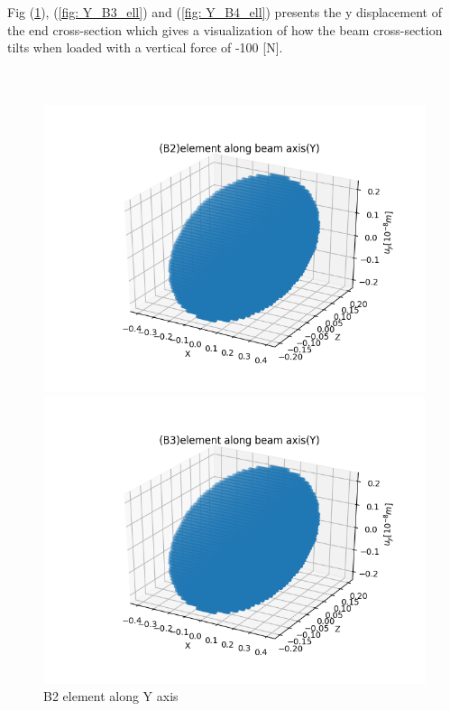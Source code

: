 \documentclass[a4paper,12pt]{article}
\begin{document}
Fig (\ref{fig: Y_B2_ell}), (\ref{fig: Y_B3_ell}) and (\ref{fig: Y_B4_ell}) presents the y displacement of the end cross-section which gives a visualization of how the beam cross-section tilts when loaded with a vertical force of -100 [N].
\\
\\ 
\\
\begin{figure}[!htbp]
  \centering
  \begin{minipage}[b]{0.49\textwidth}
    \includegraphics[width=\textwidth]{19.png}
    \caption{B2 element along Y axis}
    \label{fig: Y_B2_ell}
  \end{minipage}
  \hfill
  \begin{minipage}[b]{0.49\textwidth}
    \includegraphics[width=\textwidth]{20.png}

\end{minipage}
\end{figure}
\end{document}
